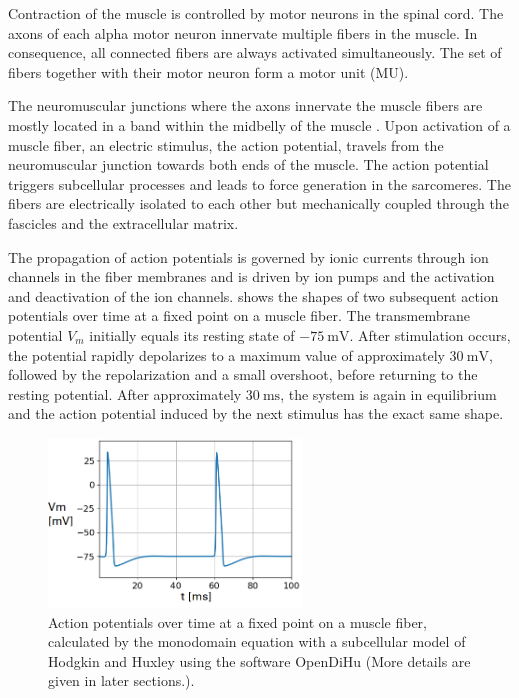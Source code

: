 Contraction of the muscle is controlled by motor neurons in the spinal cord. The axons of each alpha motor neuron innervate multiple fibers in the muscle. In consequence, all connected fibers are always activated simultaneously. The set of fibers together with their motor neuron form a motor unit (MU).

The neuromuscular junctions where the axons innervate the muscle fibers are mostly located in a band within the midbelly of the muscle \cite{Childers2004}. Upon activation of a muscle fiber, an electric stimulus, the action potential, travels from the neuromuscular junction towards both ends of the muscle. The action potential triggers subcellular processes and leads to force generation in the sarcomeres. The fibers are electrically isolated to each other but mechanically coupled through the fascicles and the extracellular matrix.

The propagation of action potentials is governed by ionic currents through ion channels in the fiber membranes and is driven by ion pumps and the activation and deactivation of the ion channels.  shows the shapes of two subsequent action potentials over time at a fixed point on a muscle fiber. The transmembrane potential $V_m$ initially equals its resting state of $\SI{-75}{\milli\volt}$. After stimulation occurs, the potential rapidly depolarizes to a maximum value of approximately $\SI{30}{\milli\volt}$, followed by the repolarization and a small overshoot, before returning to the resting potential. After approximately $\SI{30}{\milli\second}$, the system is again in equilibrium and the action potential induced by the next stimulus has the exact same shape.
 
\begin{figure}
  \centering%
  \includegraphics[width=0.6\textwidth]{images/introduction/action_potentials.png}%
  \caption{Action potentials over time at a fixed point on a muscle fiber, calculated by the monodomain equation with a subcellular model of Hodgkin and Huxley using the software OpenDiHu (More details are given in later sections.).}%
  \label{fig:action_potentials}%
\end{figure}%

